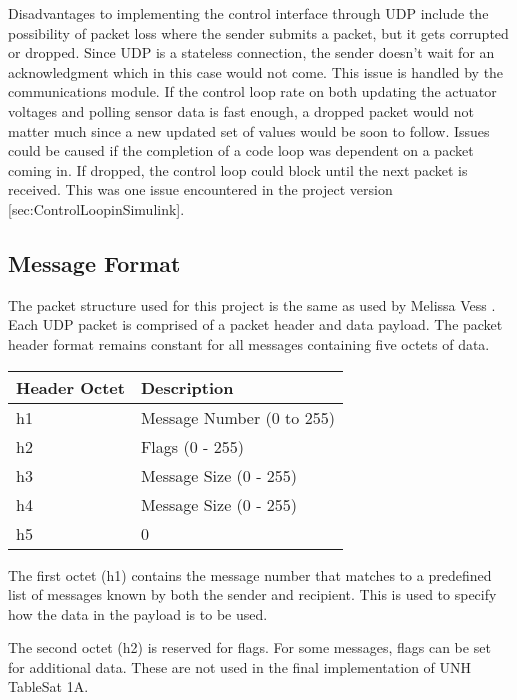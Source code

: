Disadvantages to implementing the control interface through UDP include
the possibility of packet loss where the sender submits a packet, but
it gets corrupted or dropped.  Since UDP is a stateless connection, the
sender doesn't wait for an acknowledgment which in this case would not come.
This issue is handled by the communications module.  If the control loop rate
on both updating the actuator voltages and polling sensor data is fast enough,
a dropped packet would not matter much since a new updated set of values
would be soon to follow.  Issues could be caused if the completion of a
code loop was dependent on a packet coming in.  If dropped, the control
loop could block until the next packet is received.  This was one issue
encountered in the project version [sec:ControlLoopinSimulink].



\subsection{Message Format}
\label{subsec:MessageFormat}

The packet structure used for this project is the same as used by Melissa Vess .
Each UDP packet is comprised of a packet header and data payload.  The packet
header format remains constant for all messages containing five octets of data.

\begin{center}
    \begin{tabular}{| l | l |}
    \hline
    Header Octet & Description \\ \hline
    h1 & Message Number (0 to 255) \\ \hline
    h2 & Flags (0 - 255) \\ \hline
    h3 & Message Size (0 - 255) \\ \hline
    h4 & Message Size (0 - 255) \\ \hline
    h5 & 0 \\ \hline
    \end{tabular}
\end{center}

The first octet (h1) contains the message number that matches to a predefined list
of messages known by both the sender and recipient.  This is used to specify
how the data in the payload is to be used.

The second octet (h2) is reserved for flags.  For some messages, flags can be
set for additional data.  These are not used in the final implementation of
UNH TableSat 1A.

